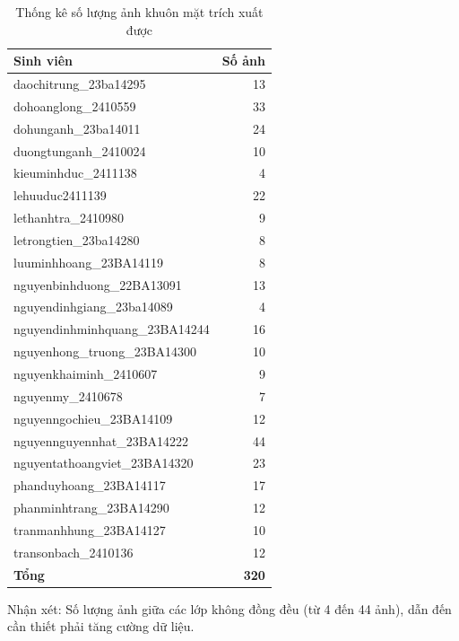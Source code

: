 \documentclass[12pt,a4paper]{article}
\begin{document}
\begin{table}[H]
    \centering
    \caption{Thống kê số lượng ảnh khuôn mặt trích xuất được}
    \label{tab:extract_summary}
    \begin{tabular}{l r}
        \toprule
        \textbf{Sinh viên} & \textbf{Số ảnh} \\
        \midrule
        daochitrung\_23ba14295      & 13 \\
        dohoanglong\_2410559        & 33 \\
        dohunganh\_23ba14011        & 24 \\
        duongtunganh\_2410024       & 10 \\
        kieuminhduc\_2411138        & 4  \\
        lehuuduc2411139             & 22 \\
        lethanhtra\_2410980         & 9  \\
        letrongtien\_23ba14280      & 8  \\
        luuminhhoang\_23BA14119     & 8  \\
        nguyenbinhduong\_22BA13091  & 13 \\
        nguyendinhgiang\_23ba14089  & 4  \\
        nguyendinhminhquang\_23BA14244 & 16 \\
        nguyenhong\_truong\_23BA14300 & 10 \\
        nguyenkhaiminh\_2410607     & 9  \\
        nguyenmy\_2410678           & 7  \\
        nguyenngochieu\_23BA14109   & 12 \\
        nguyennguyennhat\_23BA14222 & 44 \\
        nguyentathoangviet\_23BA14320 & 23 \\
        phanduyhoang\_23BA14117     & 17 \\
        phanminhtrang\_23BA14290    & 12 \\
        tranmanhhung\_23BA14127     & 10 \\
        transonbach\_2410136        & 12 \\
        \midrule
        \textbf{Tổng} & \textbf{320} \\
        \bottomrule
    \end{tabular}
\end{table}

Nhận xét: Số lượng ảnh giữa các lớp không đồng đều (từ 4 đến 44 ảnh), dẫn đến cần thiết phải tăng cường dữ liệu.
\end{document}
